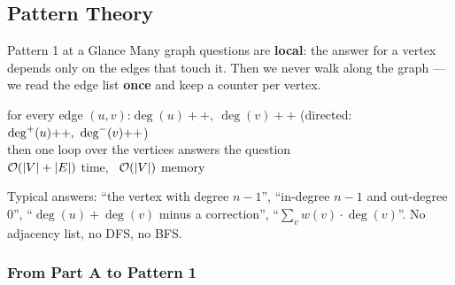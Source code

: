 \subsection{Pattern Theory}
\label{ssec:ch1-p1-theory}

\begin{patternbox}{Pattern 1 at a Glance}
Many graph questions are \textbf{local}: the answer for a vertex depends only on the edges that touch it. Then we never walk along the graph --- we read the edge list \textbf{once} and keep a counter per vertex.

\begin{center}
\end{center}

\begin{recurrencebox}
\centering
for every edge $(u,v)$:\quad $\deg(u){+}{+},\ \deg(v){+}{+}$ \quad (directed: $\outdeg{u}{+}{+},\ \indeg{v}{+}{+}$)\\[3pt]
then one loop over the vertices answers the question\\[2pt] $\mathcal{O}(|V|+|E|)$ time, \ $\mathcal{O}(|V|)$ memory
\end{recurrencebox}
Typical answers: ``the vertex with degree $n-1$'', ``in-degree $n-1$ and out-degree $0$'', ``$\deg(u)+\deg(v)$ minus a correction'', ``$\sum_v w(v)\cdot\deg(v)$''. No adjacency list, no DFS, no BFS.
\end{patternbox}

\subsubsection*{From Part A to Pattern 1}

